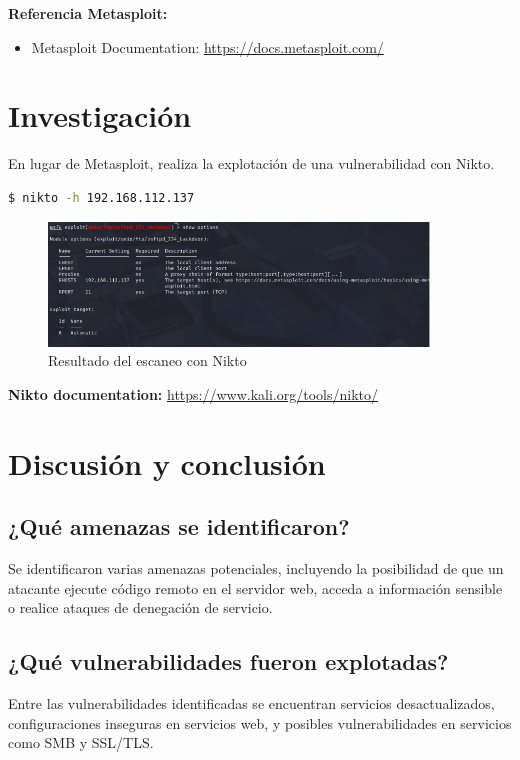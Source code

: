 \documentclass[12pt,a4paper]{article}
\begin{document}
\textbf{Referencia Metasploit:}
\begin{itemize}
    \item Metasploit Documentation: \url{https://docs.metasploit.com/}
\end{itemize}

\section{Investigación}
En lugar de Metasploit, realiza la explotación de una vulnerabilidad con Nikto.

\begin{lstlisting}[language=bash, caption=Escaneo con Nikto]
$ nikto -h 192.168.112.137
\end{lstlisting}

\begin{figure}[H]
    \centering
    \includegraphics[width=0.9\textwidth]{nikto_scan.png}
    \caption{Resultado del escaneo con Nikto}
    \label{fig:nikto_scan}
\end{figure}

\textbf{Nikto documentation:} \url{https://www.kali.org/tools/nikto/}

\section{Discusión y conclusión}
\subsection{¿Qué amenazas se identificaron?}
Se identificaron varias amenazas potenciales, incluyendo la posibilidad de que un atacante ejecute código remoto en el servidor web, acceda a información sensible o realice ataques de denegación de servicio.

\subsection{¿Qué vulnerabilidades fueron explotadas?}
Entre las vulnerabilidades identificadas se encuentran servicios desactualizados, configuraciones inseguras en servicios web, y posibles vulnerabilidades en servicios como SMB y SSL/TLS.
\end{document}
